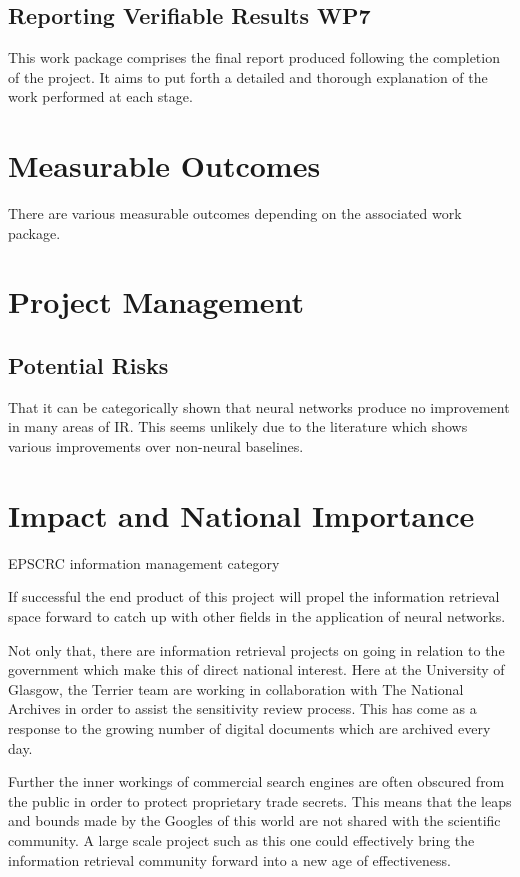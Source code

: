 \documentclass[11pt,english,twocolumn]{article}
\begin{document}
\subsection{Reporting Verifiable Results \textbf{WP7}}
This work package comprises the final report produced following the completion of the project. It aims to put forth a detailed and thorough explanation of the work performed at each stage.

\section{Measurable Outcomes}
There are various measurable outcomes depending on the associated work package.

\section{Project Management}
\subsection{Potential Risks}
That it can be categorically shown that neural networks produce no improvement in many areas of IR. This seems unlikely due to the literature which shows various improvements over non-neural baselines.

\section{Impact and National Importance}
EPSCRC information management category

If successful the end product of this project will propel the information retrieval space forward to catch up with other fields in the application of neural networks.

Not only that, there are information retrieval projects on going in relation to the government which make this of direct national interest.
Here at the University of Glasgow, the Terrier team are working in collaboration with The National Archives in order to assist the sensitivity review process. This has come as a response to the growing number of digital documents which are archived every day.

Further the inner workings of commercial search engines are often obscured from the public in order to protect proprietary trade secrets. This means that the leaps and bounds made by the Googles of this world are not shared with the scientific community. A large scale project such as this one could effectively bring the information retrieval community forward into a new age of effectiveness.
\end{document}
